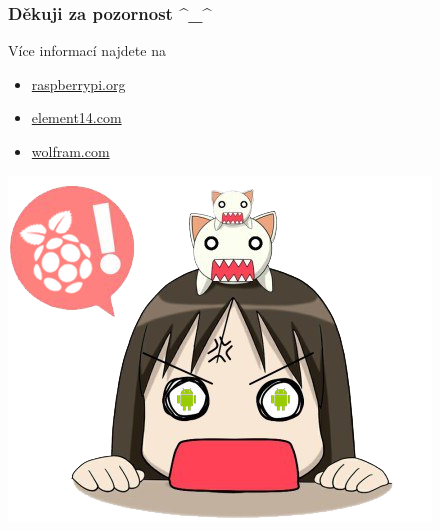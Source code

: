 \documentclass{beamer}
\begin{document}
\begin{frame}\frametitle{Děkuji za pozornost \^{}\_\^{}}
\centering
Více informací najdete na
\begin{itemize}
\centering
\item \href{http://raspberrypi.org}{raspberrypi.org}
\item \href{http://element14.com/community/community/raspberry-pi}{element14.com}
\item \href{http://wolfram.com/raspberry-pi}{wolfram.com}
\end{itemize}
\centering
\includegraphics[scale=.3]{android.png}
\end{frame}
\end{document}
